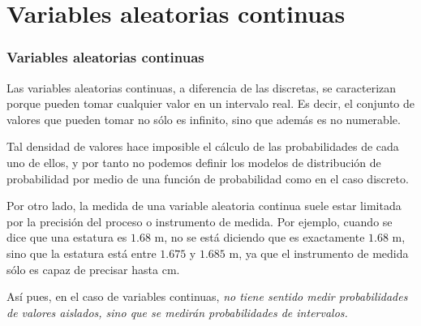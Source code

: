 \section{Variables aleatorias continuas}

	
\begin{frame}
\frametitle{Variables aleatorias continuas}
Las variables aleatorias continuas, a diferencia de las discretas, se caracterizan porque pueden tomar cualquier valor en un intervalo real.
Es decir, el conjunto de valores que pueden tomar no sólo es infinito, sino que además es no numerable.

Tal densidad de valores hace imposible el cálculo de las probabilidades de cada uno de ellos, y por tanto no podemos definir los modelos de
distribución de probabilidad por medio de una función de probabilidad como en el caso discreto.

Por otro lado, la medida de una variable aleatoria continua suele estar limitada por la precisión del proceso o instrumento de medida.
Por ejemplo, cuando se dice que una estatura es $1.68$ m, no se está diciendo que es exactamente $1.68$ m, sino que la estatura está entre
$1.675$ y $1.685$ m, ya que el instrumento de medida sólo es capaz de precisar hasta cm.

Así pues, en el caso de variables continuas, \alert{\emph{no tiene sentido medir probabilidades de valores aislados, sino que se medirán
probabilidades de intervalos.}}

\end{frame}

